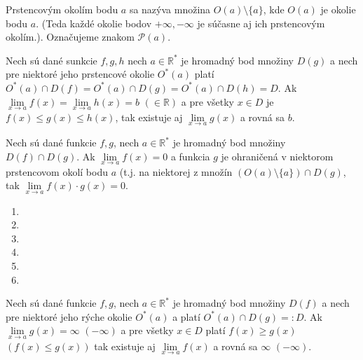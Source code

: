 \begin{definicia}
Prstencovým okolím bodu $a$  sa nazýva množina $O(a) \setminus \{ a\}$, kde
$O(a)$ je okolie bodu $a$. (Teda každé okolie bodov $+\infty,-\infty$ je súčasne
aj ich prstencovým okolím.). Označujeme znakom $\mathcal{P}(a)$.
\end{definicia}

\begin{veta}
Nech sú dané sunkcie $f, g, h$ nech $a \in \mathbb{R}^*$ je hromadný bod množiny
$D(g)$ a nech pre niektoré jeho prstencové okolie $O^*(a)$ platí $O^*(a) \cap
D(f)=O^*(a)\cap D(g)=O^*(a) \cap D(h)=D$. Ak $\lim\limits_{x \rightarrow a}
f(x)=\lim\limits_{x \rightarrow a} h(x)=b$ $( \in \mathbb{R})$ a pre všetky $x
\in D$ je $f(x) \leq g(x) \leq h(x)$, tak existuje aj $\lim\limits_{x
\rightarrow a} g(x)$ a rovná sa $b$.
\end{veta}

\begin{veta}
Nech sú dané funkcie $f, g$, nech $a \in \mathbb{R}^*$ je hromadný bod množiny
$D(f) \cap D(g)$. Ak $\lim\limits_{x \rightarrow a} f(x) = 0$ a funkcia $g$ je
ohraničená v niektorom prstencovom okolí bodu $a$ (t.j. na niektorej z množín
$(O(a) \setminus \{ a\})\cap D(g)$, tak $\lim\limits_{x \rightarrow a} f(x)
\cdot g(x)=0$.
\end{veta}

\begin{enumerate}[resume]
  \item {}
  \item {}
  \item {}
  \item {}
  \item {}
  \item {}
\end{enumerate}

\begin{veta}
Nech sú dané funkcie $f,g$, nech $a \in \mathbb{R^*}$ je hromadný bod množiny
$D(f)$ a nech pre niektoré jeho rýche okolie $O^*(a)$ a platí $O^*(a)\cap
D(g)=:D$. Ak $\lim\limits_{x \rightarrow a} g(x)=\infty$  $(-\infty)$ a pre
všetky $x \in D$ platí $f(x)\geq g(x)$  $(f(x)\leq g(x))$ tak existuje aj
$\lim\limits_{x \rightarrow a} f(x)$ a rovná sa $\infty$  $(-\infty)$.
\end{veta}

